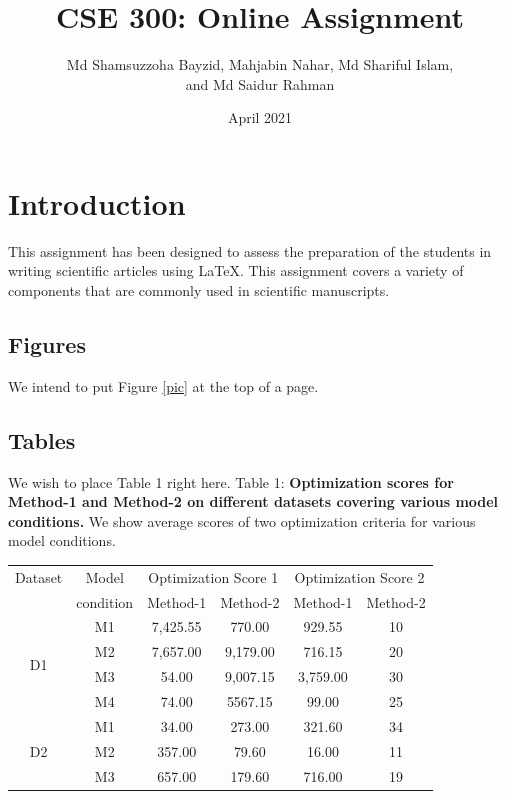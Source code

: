 \documentclass[12pt,a4paper]{article}
\author{Md Shamsuzzoha Bayzid, Mahjabin Nahar, Md Shariful Islam,\\and Md Saidur Rahman}
\title{CSE 300: Online Assignment}
\date{April 2021}
\begin{document}
 \maketitle
		\section{Introduction}
  This assignment has been designed to assess the preparation of the students in writing
  scientific articles using \LaTeX. This assignment covers a variety of components that are
  commonly used in scientific manuscripts.

   \subsection{Figures}
   We intend to put Figure \ref{pic}  at the top of a page.
	\subsection{Tables}
	We wish to place Table 1 right here.
	\newline
	\newline
	Table 1: \textbf{Optimization scores for Method-1 and Method-2 on different datasets covering various model conditions.} We show average scores of two optimization
	criteria for various model conditions.
	\begin{table}[h]
		\centering
		\begin{tabular}{|c c|c c|c c|}
			\hline
			Dataset & Model &\multicolumn{2}{|c|}{Optimization Score 1}&\multicolumn{2}{|c|}{Optimization Score 2} \\
			\cline{3-6}
			& condition & Method-1 & Method-2 & Method-1 & Method-2\\
			\hline
			\hline
		  \multirow{4}{*}{D1}&M1&7,425.55&770.00&929.55&10\\
		   &M2&7,657.00&9,179.00&716.15&20\\
		   &M3&54.00&9,007.15&3,759.00&30\\
		   &M4&74.00&5567.15&99.00&25\\
		   \hline
		    \multirow{3}{*}{D2}&M1&34.00&273.00&321.60&34\\
		    &M2&357.00&79.60&16.00&11\\
		    &M3&657.00&179.60&716.00&19\\
		    \hline
		\end{tabular}  
	\end{table}
\end{document}
